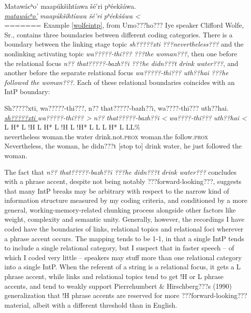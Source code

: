 \documentclass[output=paper]{LSP/langsci}
\begin{document}
\ea\label{eagleosv}
Matawácʰo’ maapúkšihtíawa šé’ri pʰéekšáwa.\footnotemark\\
\gll	\emph{\underline{matawácʰo’}}		\emph{maapúkšihtíawa} 	\emph{šé’ri} 	\emph{pʰéekšáwa <}\\
=======
Example \ref{wolfeintp}, from Umo???ho??? Iye speaker Clifford Wolfe, Sr., contains three boundaries between different coding categories. There is a boundary between the linking stage topic \emph{sh?????xti ???nevertheless???} and the nonlinking activating topic \emph{wa?????-thi??? ???the woman???}, then one before the relational focus \emph{n?? that?????-bazh??i ???he didn???t drink water???}, and another before the separate relational focus \emph{wa?????-thi??? uth??hai ???he followed the woman???}. Each of these relational boundaries coincides with an IntP boundary:

\ea\label{wolfeintp}
 	Sh?????xti, wa?????-thi???, n?? that?????-bazh??i, wa????-thi??? uth??hai.\footnotemark\\
\glll	\emph{\underline{sh?????xti }}	\emph{wa?????-thi??? >}		\emph{n??} 		\emph{that?????-bazh??i <}		\emph{wa????-thi???} 	\emph{uth??hai <}\\
	{\ob L H* L !H\cb}			{\ob L H* L !H\cb}		{\ob L}		{!H* L L\cb}	{\ob L H* L}		{L\cb{}L\%}\\
	nevertheless				woman.the			water			drink.not.\textsc{prox} 		woman.the		follow.\textsc{prox}\\
\glt	Nevertheless, the woman, he didn???t [stop to] drink water, he just followed the woman. 
\z

The fact that \emph{n?? that?????-bazh??i ???he didn???t drink water???} concludes with a phrase accent, despite not being notably ???forward-looking???, suggests that many IntP breaks may be arbitrary with respect to the narrow kind of information structure measured by my coding criteria, and conditioned by a more general, working-memory-related chunking process alongside other factors like weight, complexity and semantic unity. Generally, however, the recordings I have coded have the boundaries of links, relational topics and relational foci wherever a phrase accent occurs. The mapping tends to be 1-1, in that a single IntP tends to include a single relational category, but I suspect that in faster speech -- of which I coded very little -- speakers may stuff more than one relational category into a single IntP. When the referent of a string is a relational focus, it gets a L phrase accent, while links and relational topics tend to get !H or L phrase accents, and tend to weakly support Pierrehumbert \& Hirschberg???s (1990) generalization that !H phrase accents are reserved for more ???forward-looking??? material, albeit with a different threshold than in English.
\end{document}
